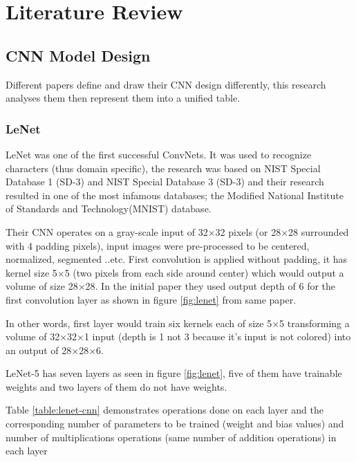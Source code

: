 \chapter{Literature Review}


\section{CNN Model Design}

Different papers define and draw their CNN design differently,
this research analyses them then represent them into a unified table.


\subsection{LeNet}

LeNet\autocite{lecun1998gradient} was one of the first successful ConvNets. 
It was used to recognize characters (thus domain specific),
the research was based on NIST Special Database 1 (SD-3)\autocite{wilson1990nist}
and NIST Special Database 3 (SD-3)\autocite{garris1992nist}
and their research resulted in one of the most infamous databases;
the Modified National Institute of Standards and Technology(MNIST) database\autocite{lecun2010mnist}.

Their CNN operates on a gray-scale input of 32×32 pixels (or 28×28 surrounded with 4 padding pixels),
input images were pre-processed to be centered, normalized, segmented ..etc.
First convolution is applied without padding, it has kernel size 5×5 (two pixels from each side around center)
which would output a volume of size 28×28. In the initial paper they used output
depth of 6 for the first convolution layer as shown in figure \ref{fig:lenet} from same paper.

In other words, first layer would train six kernels each of size 5×5 transforming
a volume of 32×32×1 input (depth is 1 not 3 because it's input is not colored)
into an output of 28×28×6.

LeNet-5 has seven layers as seen in figure \ref{fig:lenet},
five of them have trainable weights and two layers of them do not have weights.

Table \ref{table:lenet-cnn} demonstrates operations done on each layer and the corresponding number of parameters
to be trained (weight and bias values) and number of multiplications operations
(same number of addition operations) in each layer

